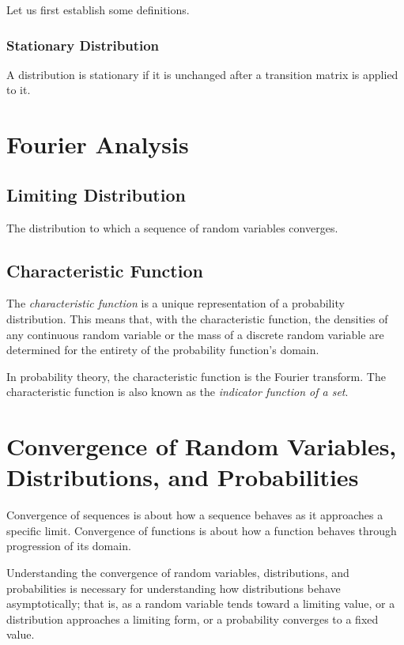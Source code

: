 \documentclass{article}
\begin{document}
Let us first establish some definitions.

\subsubsection{Stationary Distribution}

A distribution is stationary if it is unchanged after a transition matrix is applied to it.




\newpage
\section{Fourier Analysis}


\subsection{Limiting Distribution} The distribution to which a sequence of random variables converges.

\subsection{Characteristic Function} The \emph{characteristic function} is a unique representation of a probability distribution. This means that, with the characteristic function, the densities of any continuous random variable or the mass of a discrete random variable are determined for the entirety of the probability function's domain.

In probability theory, the characteristic function is the Fourier transform. The characteristic function is also known as the \emph{indicator function of a set}. 


\newpage
\section{Convergence of Random Variables, Distributions, and Probabilities}

Convergence of sequences is about how a sequence behaves as it approaches a specific limit. Convergence of functions is about how a function behaves through progression of its domain. 

Understanding the convergence of random variables, distributions, and probabilities is necessary for understanding how distributions behave asymptotically; that is, as a random variable tends toward a limiting value, or a distribution approaches a limiting form, or a probability converges to a fixed value.
\end{document}
